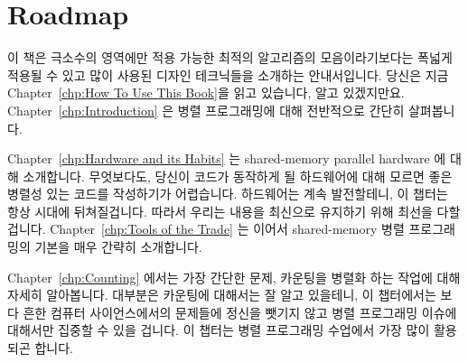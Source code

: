 
\section{Roadmap}
\label{sec:howto:Roadmap}

이 책은 극소수의 영역에만 적용 가능한 최적의 알고리즘의 모음이라기보다는 폭넓게
적용될 수 있고 많이 사용된 디자인 테크닉들을 소개하는 안내서입니다.  당신은
지금 Chapter~\ref{chp:How To Use This Book}을 읽고 있습니다, 알고 있겠지만요.
Chapter~\ref{chp:Introduction} 은 병렬 프로그래밍에 대해 전반적으로 간단히
살펴봅니다.


Chapter~\ref{chp:Hardware and its Habits} 는 shared-memory parallel hardware 에
대해 소개합니다.  무엇보다도, 당신이 코드가 동작하게 될 하드웨어에 대해 모르면
좋은 병렬성 있는 코드를 작성하기가 어렵습니다. 하드웨어는 계속 발전할테니, 이
챕터는 항상 시대에 뒤쳐질겁니다.  따라서 우리는 내용을 최신으로 유지하기 위해
최선을 다할겁니다.  Chapter~\ref{chp:Tools of the Trade} 는 이어서
shared-memory 병렬 프로그래밍의 기본을 매우 간략히 소개합니다.


Chapter~\ref{chp:Counting} 에서는 가장 간단한 문제, 카운팅을 병렬화 하는 작업에
대해 자세히 알아봅니다.  대부분은 카운팅에 대해서는 잘 알고 있을테니, 이
챕터에서는 보다 흔한 컴퓨터 사이언스에서의 문제들에 정신을 뺏기지 않고 병렬
프로그래밍 이슈에 대해서만 집중할 수 있을 겁니다.  이 챕터는 병렬 프로그래밍
수업에서 가장 많이 활용되곤 합니다.

